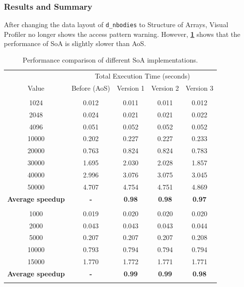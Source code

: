 \documentclass[12pt, a4paper]{article}
\let\oldcref\cref
\renewcommand{\cref}[1]{\textbf{\oldcref{#1}}}
\begin{document}
\subsubsection{Results and Summary}
After changing the data layout of \texttt{d\_nbodies} to Structure of Arrays, Visual Profiler no
longer shows the access pattern warning. However, \cref{table:soa_layout} shows that the performance
of SoA is slightly slower than AoS.
\renewcommand{\arraystretch}{1.3}
\begin{longtable}{|c|c|c|c|c|}
  \hline \endfirsthead & \multicolumn{4}{c|}{Total Execution Time (seconds)} \\ \cline{2-5}
  \multirow{-2}{*}{Value} & Before (AoS) & Version 1 & Version 2 & Version 3 \\ \hline
  \rowcolor{lightgray}\multicolumn{5}{|c|}{\textbf{Number of Bodies (N)}} \\ \hline
  1024  & 0.012 & 0.011 & 0.011 & 0.012 \\
  2048  & 0.024 & 0.021 & 0.021 & 0.022 \\
  4096  & 0.051 & 0.052 & 0.052 & 0.052 \\
  10000 & 0.202 & 0.227 & 0.227 & 0.233 \\
  20000 & 0.763 & 0.824 & 0.824 & 0.783 \\
  30000 & 1.695 & 2.030 & 2.028 & 1.857 \\
  40000 & 2.996 & 3.076 & 3.075 & 3.045 \\
  50000 & 4.707 & 4.754 & 4.751 & 4.869 \\ \hline
  \textbf{Average speedup} & \textbf{-} & \textbf{0.98} & \textbf{0.98} & \textbf{0.97} \\ \hline
  \rowcolor{lightgray}\multicolumn{5}{|c|}{\textbf{Activity Grid Dimension (D)}} \\ \hline
  1000  & 0.019 & 0.020 & 0.020 & 0.020 \\
  2000  & 0.043 & 0.043 & 0.043 & 0.044 \\
  5000  & 0.207 & 0.207 & 0.207 & 0.208 \\
  10000 & 0.793 & 0.794 & 0.794 & 0.794 \\
  15000 & 1.770 & 1.772 & 1.771 & 1.771 \\ \hline
  \textbf{Average speedup} & \textbf{-} & \textbf{0.99} & \textbf{0.99} & \textbf{0.98} \\ \hline
  \caption{Performance comparison of different SoA implementations.}
  \label{table:soa_layout}
\end{longtable}
\renewcommand{\arraystretch}{1}
\end{document}
